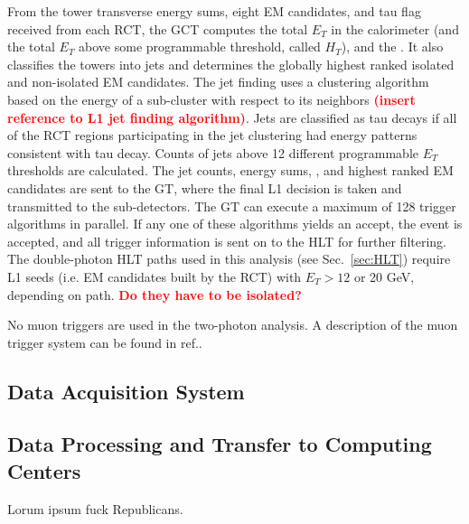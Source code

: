 \documentclass[dissertation.tex]{subfiles}
\begin{document}
From the tower transverse energy sums, eight EM candidates, and tau flag received from each RCT, the GCT computes the total $E_{T}$ in the calorimeter (and the total $E_{T}$ above some programmable threshold, called $H_{T}$), and the \MET.  It also classifies the towers into jets and determines the globally highest ranked isolated and non-isolated EM candidates.  The jet finding uses a clustering algorithm based on the energy of a sub-cluster with respect to its neighbors \textcolor{red}{\textbf{(insert reference to L1 jet finding algorithm)}}.  Jets are classified as tau decays if all of the RCT regions participating in the jet clustering had energy patterns consistent with tau decay.  Counts of jets above 12 different programmable $E_{T}$ thresholds are calculated.  The jet counts, energy sums, \MET, and highest ranked EM candidates are sent to the GT, where the final L1 decision is taken and transmitted to the sub-detectors.  The GT can execute a maximum of 128 trigger algorithms in parallel.  If any one of these algorithms yields an accept, the event is accepted, and all trigger information is sent on to the HLT for further filtering.  The double-photon HLT paths used in this analysis (see Sec.~\ref{sec:HLT}) require L1 seeds (i.e. EM candidates built by the RCT) with $E_{T} > 12$ or 20 GeV, depending on path.  \textcolor{red}{\textbf{Do they have to be isolated?}}

No muon triggers are used in the two-photon analysis.  A description of the muon trigger system can be found in ref.\cite{CMS_detector_paper}.

\subsection{Data Acquisition System}
\subsection{Data Processing and Transfer to Computing Centers}
\label{sec:Data Processing and Transfer to Computing Centers}

Lorum ipsum fuck Republicans.
\end{document}
